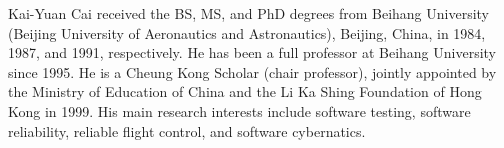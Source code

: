 \documentclass[10pt,journal,compsoc]{IEEEtran}
\begin{document}
\begin{IEEEbiography}{Kai-Yuan Cai} received the BS, MS, and PhD degrees from Beihang University (Beijing University of Aeronautics and Astronautics), Beijing, China, in 1984, 1987, and 1991, respectively. He has been a full professor at Beihang University since 1995. He is a Cheung Kong Scholar (chair professor), jointly appointed by the Ministry of Education of China and  the Li Ka Shing Foundation of Hong Kong in 1999. His main research interests include software testing, software reliability, reliable flight control, and software cybernatics.
\end{IEEEbiography}




\ifCLASSOPTIONcaptionsoff
  \newpage
\fi


\end{document}

